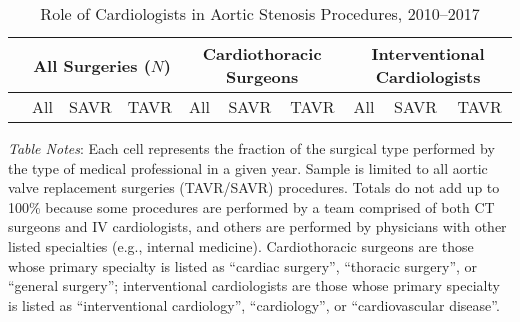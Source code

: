 \begin{table}[htbp]
    \centering
    \begin{threeparttable}
    \begin{tabular}{l|ccc|ccc|ccc}
    \toprule
     & \multicolumn{3}{c}{All Surgeries ($N$)} & \multicolumn{3}{c}{Cardiothoracic Surgeons} & \multicolumn{3}{c}{Interventional Cardiologists} \\
     \midrule
     & All & SAVR & TAVR  & All  & SAVR & TAVR & All  & SAVR & TAVR \\
     \midrule
     
    \bottomrule
    \end{tabular}
    \caption{Role of Cardiologists in Aortic Stenosis Procedures, 2010--2017\label{tab:supplier-adoption}}
    \begin{tablenotes}
        \small
        \item \textit{Table Notes}: Each cell represents the fraction of the surgical type performed by the type of medical professional in a given year. Sample is limited to all aortic valve replacement surgeries (TAVR/SAVR) procedures. Totals do not add up to 100\% because some procedures are performed by a team comprised of both CT surgeons and IV cardiologists, and others are performed by physicians with other listed specialties (e.g., internal medicine). Cardiothoracic surgeons are those whose primary specialty is listed as “cardiac surgery”, “thoracic surgery”, or “general surgery”; interventional cardiologists are those whose primary specialty is listed as “interventional cardiology”, “cardiology”, or “cardiovascular disease”. 
    \end{tablenotes}
    \end{threeparttable}
\end{table}